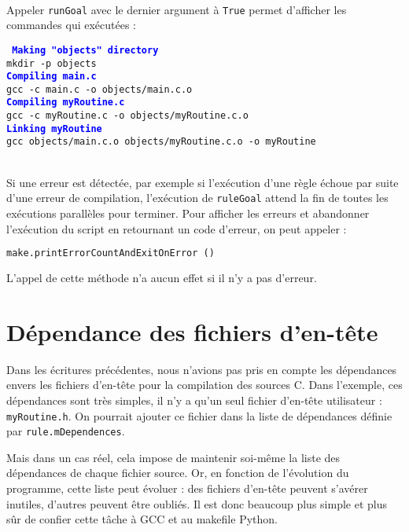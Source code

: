 \documentclass[a4paper,11pt]{extarticle}
\begin{document}
~\\Appeler \texttt{runGoal} avec le dernier argument à \texttt{True} permet d'afficher les commandes qui exécutées :

\begin{mdframed}[hidealllines=true,backgroundcolor=lightgray!20]
\tt\footnotesize
\textcolor{blue}{\bf Making "objects" directory}\\
mkdir -p objects\\
\textcolor{blue}{\bf Compiling main.c}\\
gcc -c main.c -o objects/main.c.o\\
\textcolor{blue}{\bf Compiling myRoutine.c}\\
gcc -c myRoutine.c -o objects/myRoutine.c.o\\
\textcolor{blue}{\bf Linking myRoutine}\\
gcc objects/main.c.o objects/myRoutine.c.o -o myRoutine
\end{mdframed}

~\\Si une erreur est détectée, par exemple si l'exécution d'une règle échoue par suite d'une erreur de compilation, l'exécution de \texttt{ruleGoal} attend la fin de toutes les exécutions parallèles pour terminer. Pour afficher les erreurs et abandonner l'exécution du script en retournant un code d'erreur, on peut appeler :
\begin{lstlisting}[language=py]
make.printErrorCountAndExitOnError ()
\end{lstlisting}
L'appel de cette méthode n'a aucun effet si il n'y a pas d'erreur.

\section{Dépendance des fichiers d'en-tête}


Dans les écritures précédentes, nous n'avions pas pris en compte les dépendances envers les fichiers d'en-tête pour la compilation des sources C. Dans l'exemple, ces dépendances sont très simples, il n'y a qu'un seul fichier d'en-tête utilisateur : \texttt{myRoutine.h}. On pourrait ajouter ce fichier dans la liste de dépendances définie par \texttt{rule.mDependences}.

Mais dans un cas réel, cela impose de maintenir soi-même la liste des dépendances de chaque fichier source. Or, en fonction de l'évolution du programme, cette liste peut évoluer : des fichiers d'en-tête peuvent s'avérer inutiles, d'autres peuvent être oubliés. Il est donc beaucoup plus simple et plus sûr de confier cette tâche à GCC et au makefile Python.
\end{document}
